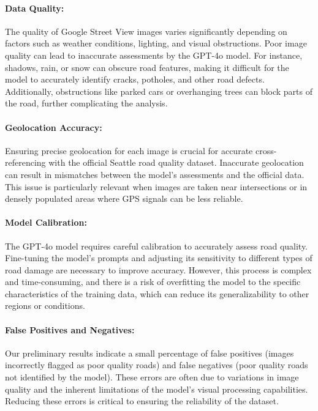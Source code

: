 \documentclass{article}
\begin{document}
\paragraph{Data Quality:}
The quality of Google Street View images varies significantly depending on factors such as weather conditions, lighting, and visual obstructions. Poor image quality can lead to inaccurate assessments by the GPT-4o model. For instance, shadows, rain, or snow can obscure road features, making it difficult for the model to accurately identify cracks, potholes, and other road defects. Additionally, obstructions like parked cars or overhanging trees can block parts of the road, further complicating the analysis.

\paragraph{Geolocation Accuracy:}
Ensuring precise geolocation for each image is crucial for accurate cross-referencing with the official Seattle road quality dataset. Inaccurate geolocation can result in mismatches between the model's assessments and the official data. This issue is particularly relevant when images are taken near intersections or in densely populated areas where GPS signals can be less reliable.

\paragraph{Model Calibration:}
The GPT-4o model requires careful calibration to accurately assess road quality. Fine-tuning the model's prompts and adjusting its sensitivity to different types of road damage are necessary to improve accuracy. However, this process is complex and time-consuming, and there is a risk of overfitting the model to the specific characteristics of the training data, which can reduce its generalizability to other regions or conditions.

\paragraph{False Positives and Negatives:}
Our preliminary results indicate a small percentage of false positives (images incorrectly flagged as poor quality roads) and false negatives (poor quality roads not identified by the model). These errors are often due to variations in image quality and the inherent limitations of the model's visual processing capabilities. Reducing these errors is critical to ensuring the reliability of the dataset.
\end{document}
